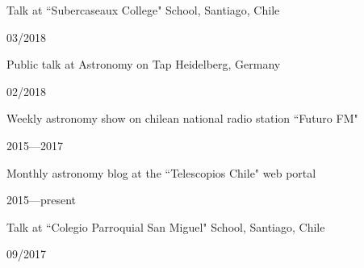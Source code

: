 \documentclass[12pt, a4paper]{article} %
\begin{document}
\begin{minipage}[t]{0.7\textwidth}
\begin{flushleft}%
  \setlength{\leftskip}{0.2cm}%
Talk at ``Subercaseaux College" School, Santiago, Chile
\end{flushleft}
\end{minipage}
\begin{minipage}[t]{0.3\textwidth}
\hfill 03/2018
\end{minipage}

\begin{minipage}[t]{0.7\textwidth}
\begin{flushleft}%
  \setlength{\leftskip}{0.2cm}%
Public talk at Astronomy on Tap Heidelberg, Germany 
\end{flushleft}
\end{minipage}
\begin{minipage}[t]{0.3\textwidth}
\hfill 02/2018
\end{minipage}

\begin{minipage}[t]{0.7\textwidth}
\begin{flushleft}%
  \setlength{\leftskip}{0.2cm}%
Weekly astronomy show on chilean national radio station ``Futuro FM"
\end{flushleft}
\end{minipage}
\begin{minipage}[t]{0.3\textwidth}
\hfill 2015---2017
\end{minipage}


\begin{minipage}[t]{0.7\textwidth}
\begin{flushleft}%
  \setlength{\leftskip}{0.2cm}%
Monthly astronomy blog at the ``Telescopios Chile" web portal
\end{flushleft}
\end{minipage}
\begin{minipage}[t]{0.3\textwidth}
\hfill 2015---present
\end{minipage}

\begin{minipage}[t]{0.7\textwidth}
\begin{flushleft}%
  \setlength{\leftskip}{0.2cm}%
Talk at ``Colegio Parroquial San Miguel" School, Santiago, Chile
\end{flushleft}
\end{minipage}
\begin{minipage}[t]{0.3\textwidth}
\hfill 09/2017
\end{minipage}
\end{document}
